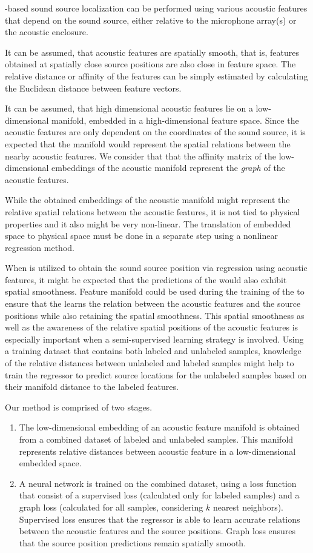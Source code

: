 \documentclass[applsci,article,submit,moreauthors,pdftex]{Definitions/mdpi}
\begin{document}
\ann{}-based sound source localization can be performed using various acoustic features that depend on the sound source, either relative to the microphone array(s) or the acoustic enclosure.

It can be assumed, that acoustic features are spatially smooth, that is, features obtained at spatially close source positions are also close in feature space. The relative distance or affinity of the features can be simply estimated by calculating the Euclidean distance between feature vectors. 

It can be assumed, that high dimensional acoustic features lie on a low-dimensional manifold, embedded in a high-dimensional feature space. 
Since the acoustic features are only dependent on the coordinates of the sound source, it is expected that the manifold would represent the spatial relations between the nearby acoustic features. 
We consider that that the affinity matrix of the low-dimensional embeddings of the acoustic manifold represent the \emph{graph} of the acoustic features.

While the obtained embeddings of the acoustic manifold might represent the relative spatial relations between the acoustic features, it is not tied to physical properties and it also might be very non-linear. The translation of embedded space to physical space must be done in a separate step using a nonlinear regression method. 

When \ann{} is utilized to obtain the sound source position via regression using acoustic features, it might be expected that the predictions of the \ann{} would also exhibit spatial smoothness. Feature manifold could be used during the training of the \ann{} to ensure that the \ann{} learns the relation between the acoustic features and the source positions while also retaining the spatial smoothness.
This spatial smoothness as well as the awareness of the relative spatial positions of the acoustic features is especially important when a semi-supervised learning strategy is involved. Using a training dataset that contains both labeled and unlabeled samples, knowledge of the relative distances between unlabeled and labeled samples might help to train the regressor to predict source locations for the unlabeled samples based on their manifold distance to the labeled features.


Our method is comprised of two stages.
\begin{enumerate}
	\item The low-dimensional embedding of an acoustic feature manifold is obtained from a combined dataset of labeled and unlabeled samples. This manifold represents relative distances between acoustic feature in a low-dimensional embedded space.
	\item A neural network is trained on the combined dataset, using a loss function that consist  of a supervised loss (calculated only for labeled samples) and a graph loss (calculated for all samples, considering $ k $ nearest neighbors). Supervised loss ensures that the regressor is able to learn accurate relations between the acoustic features and the source positions. Graph loss ensures that the source position predictions remain spatially smooth.
\end{enumerate}
\end{document}
